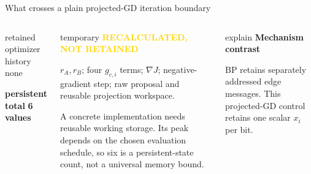 \documentclass[aspectratio=169,9pt,t]{beamer}
\newcommand{\callout}[1]{%
  \begin{beamercolorbox}[rounded=true,sep=.65ex]{explain}
    \scriptsize #1
  \end{beamercolorbox}}
\begin{document}
\begin{frame}{What crosses a plain projected-GD iteration boundary}
\begin{columns}[T,onlytextwidth]
\begin{beamercolorbox}[rounded=true,sep=.8ex]{retained}
        optimizer history \hfill none\par\vspace{.6mm}
        \textbf{persistent total} \hfill \textbf{6 values}
      \end{beamercolorbox}
      \vspace{1mm}
      \begin{beamercolorbox}[rounded=true,sep=.8ex]{temporary}
        \scriptsize\textcolor{Gold}{\bfseries RECALCULATED, NOT RETAINED}\par\vspace{.5mm}
        $r_A,r_B$; four $g_{c,i}$ terms; $\nabla J$; negative-gradient step; raw proposal and reusable projection workspace.\par\vspace{.5mm}
        A concrete implementation needs reusable working storage. Its peak depends on the chosen evaluation schedule, so six is a persistent-state count, not a universal memory bound.
      \end{beamercolorbox}
      \vspace{1mm}
      \callout{\centering\textbf{Mechanism contrast}\par
        BP retains separately addressed edge messages. This projected-GD control retains one scalar $x_i$ per bit.}
  \end{columns}

\end{frame}
\end{document}
